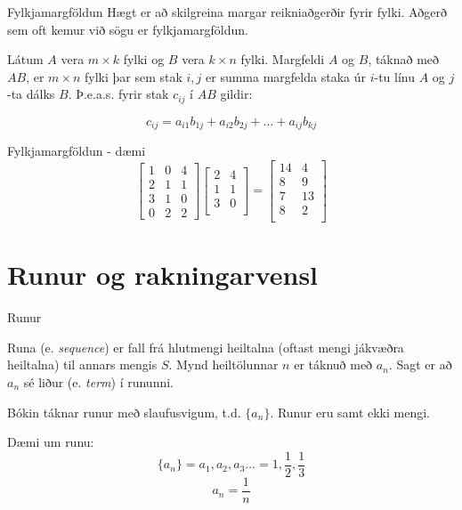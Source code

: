 \documentclass{beamer}
\begin{document}
\begin{frame}{Fylkjamargföldun}
Hægt er að skilgreina margar reikniaðgerðir fyrir fylki. Aðgerð sem oft kemur við sögu er fylkjamargföldun.

\begin{tcolorbox}[title=Fylkjamargföldun]
Látum $A$ vera $m \times k$ fylki og $B$ vera $k \times n$ fylki. Margfeldi $A$ og $B$, táknað með $AB$, er $m \times n$ fylki þar sem stak $i, j$ er summa margfelda staka úr $i$-tu línu $A$ og $j$-ta dálks $B$. Þ.e.a.s. fyrir stak $c_{ij}$ í $AB$ gildir:

\[
 c_{ij} = a_{i1}b_{1j} + a_{i2}b_{2j} + \ldots + a_{ij}b_{kj}
\]
\end{tcolorbox}
\end{frame}

\begin{frame}{Fylkjamargföldun - dæmi}
\[
\begin{bmatrix}
1&0&4\\2&1&1\\3&1&0\\0&2&2
\end{bmatrix}
\begin{bmatrix}
2&4\\
1&1\\
3&0\\
\end{bmatrix}
=
\begin{bmatrix}
14&4\\
8&9\\
7&13\\
8&2\\
\end{bmatrix}
\]

\end{frame}


\section{Runur og rakningarvensl}

\begin{frame}{Runur}
\begin{tcolorbox}[title=Runur]
Runa (e. \emph{sequence}) er fall frá hlutmengi heiltalna (oftast mengi jákvæðra heiltalna) til annars mengis $S$. Mynd heiltölunnar $n$ er táknuð með $a_n$. Sagt er að $a_n$ sé liður (e. \emph{term}) í rununni.
\end{tcolorbox}
Bókin táknar runur með slaufusvigum, t.d. $\{a_n\}$. Runur eru samt ekki mengi.

Dæmi um runu:
\[
 \{a_n\} = a_1, a_2, a_3 \ldots = 1, \frac{1}{2}, \frac{1}{3}
\]
\[
 a_n = \frac{1}{n}
\]
\end{frame}
\end{document}
